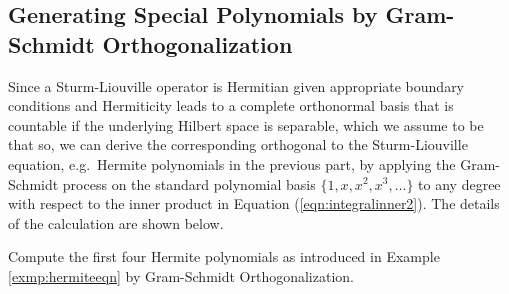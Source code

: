 \subsection{Generating Special Polynomials by Gram-Schmidt Orthogonalization}

Since a Sturm-Liouville operator is Hermitian given appropriate boundary conditions and Hermiticity leads to a complete orthonormal basis that is countable if the underlying Hilbert space is separable, which we assume to be that so, we can derive the corresponding orthogonal  to the Sturm-Liouville equation, e.g.\ Hermite polynomials in the previous part, by applying the Gram-Schmidt process on the standard polynomial basis $\{1, x, x^2, x^3, \ldots\}$ to any degree with respect to the inner product in Equation (\ref{eqn:integralinner2}). The details of the calculation are shown below.
\begin{exmp}
Compute the first four Hermite polynomials as introduced in Example \ref{exmp:hermiteeqn} by Gram-Schmidt Orthogonalization.
\end{exmp}
